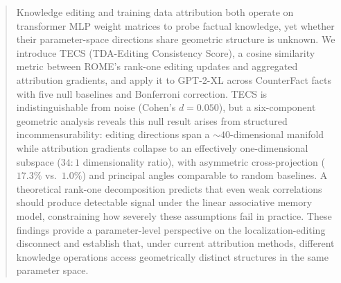 \begin{abstract}
Knowledge editing and training data attribution both operate on transformer MLP weight matrices to probe factual knowledge, yet whether their parameter-space directions share geometric structure is unknown.
We introduce TECS (TDA-Editing Consistency Score), a cosine similarity metric between ROME's rank-one editing updates and aggregated attribution gradients, and apply it to GPT-2-XL across %
CounterFact facts with five null baselines and Bonferroni correction.
TECS is indistinguishable from noise (Cohen's $d = 0.050$), but a six-component geometric analysis reveals this null result arises from structured incommensurability: editing directions span a ${\sim}40$-dimensional manifold while attribution gradients collapse to an effectively one-dimensional subspace ($34{:}1$ dimensionality ratio), with asymmetric cross-projection ($17.3\%$ vs.\ $1.0\%$) and principal angles comparable to random baselines.
A theoretical rank-one decomposition predicts that even weak correlations should produce detectable signal under the linear associative memory model, constraining how severely these assumptions fail in practice.
These findings provide a parameter-level perspective on the localization-editing disconnect and establish that, under current attribution methods, different knowledge operations access geometrically distinct structures in the same parameter space.
\end{abstract}

